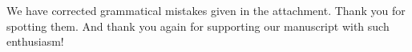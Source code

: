 We have corrected grammatical mistakes given in the attachment. Thank you for
spotting them. And thank you again for supporting our manuscript with such
enthusiasm!







